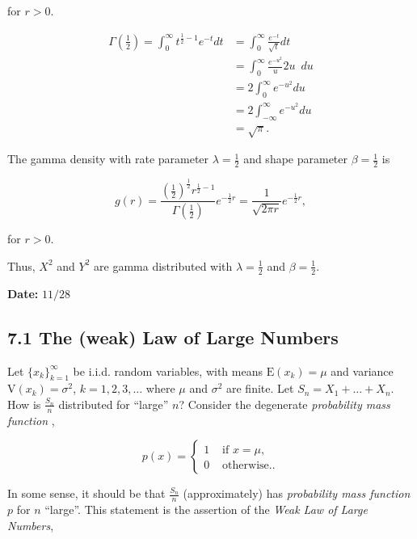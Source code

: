 \documentclass[12pt]{article}
\newcommand{\expected}[1]{\text{E}(#1)}
\newcommand{\variance}[1]{\text{V}(#1)}
\begin{document}
\noindent
for $r > 0$.

\begin{tcolorbox}
\begin{align*}
\Gamma(\frac{1}{2}) = \int_{0}^{\infty} t^{\frac{1}{2} - 1} e^{-t} dt &= \int_{0}^{\infty} \frac{e^{-t}}{\sqrt{t}} dt \\
&= \int_{0}^{\infty} \frac{e^{-u^2}}{u} 2u \enspace du \\
&= 2 \int_{0}^{\infty} e^{-u^2} du \\
&= 2 \int_{- \infty}^{\infty} e^{-u^2} du \\
&= \sqrt{\pi}.
\end{align*}

\noindent
The gamma density with rate parameter $\lambda = \frac{1}{2}$ and shape parameter $\beta = \frac{1}{2}$ is

\begin{equation*}
g(r) = \frac{(\frac{1}{2})^{\frac{1}{2}} r^{\frac{1}{2} - 1}}{\Gamma(\frac{1}{2})} e^{- \frac{1}{2} r}
= \frac{1}{\sqrt{2 \pi r}} e^{- \frac{1}{2} r},
\end{equation*}

for $r > 0$.

Thus, $X^2$ and $Y^2$ are gamma distributed with $\lambda = \frac{1}{2}$ and $\beta = \frac{1}{2}$.
\end{tcolorbox}

\begin{flushright}
\textbf{Date:} $11/28$
\end{flushright}

\subsection*{7.1 The (weak) Law of Large Numbers}

\noindent
Let $\big \{ x_k \big \}_{k=1}^{\infty}$ be i.i.d. random variables, with means $\expected{x_k} = \mu$ and variance $\variance{x_k} = \sigma^2$, $k = 1, 2, 3, \ldots$ where $\mu$ and $\sigma^2$ are finite. Let $S_n = X_1 + \ldots + X_n$. How is $\frac{S_n}{n}$ distributed for ``large'' $n$? Consider the degenerate \textit{probability mass function} ,

\[ p(x) = \begin{cases} 
      1 & \text{ if } x = \mu, \\
      0 & \text{ otherwise.}.
      \end{cases} \]

\noindent
In some sense, it should be that $\frac{S_n}{n}$ (approximately) has \textit{probability mass function} $p$ for $n$ ``large''. This statement is the assertion of the \textit{Weak Law of Large Numbers}, 
\end{document}
